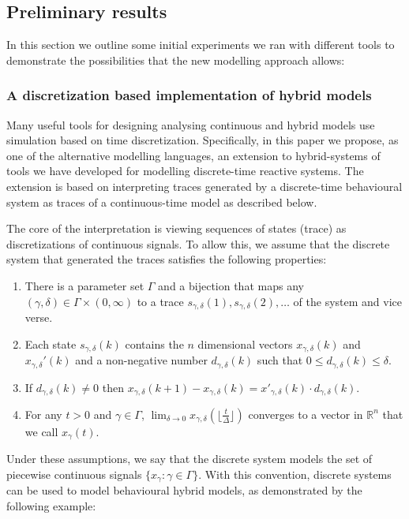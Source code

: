\documentclass[11pt]{article}
\newcounter{example}
\begin{document}
\subsection{Preliminary results}
In this section we outline some initial experiments we ran with different tools to demonstrate the possibilities that the new modelling approach allows:

\subsubsection{A discretization based implementation of hybrid models}
\label{sec:simulation}  
Many useful tools for designing analysing continuous and hybrid models use simulation based on time discretization. Specifically, in this paper we propose, as one of the alternative modelling languages, an extension to hybrid-systems of tools we have developed for modelling discrete-time reactive systems. The  extension is based on interpreting traces generated by a discrete-time behavioural system as traces of a continuous-time model as described below.

The core of the interpretation is viewing sequences of states (trace) as discretizations of continuous signals. To allow this, we assume that the discrete system that generated the traces satisfies the following properties:
\begin{enumerate}
	\item There is a parameter set $\Gamma$ and a bijection that maps any $(\gamma, \delta) \in \Gamma \times (0,\infty)$ to a trace  $s_{\gamma,\delta}(1),s_{\gamma,\delta}(2),\dots$ of the system and vice verse. 
	\item Each state $s_{\gamma,\delta}(k)$ contains the $n$ dimensional vectors $x_{\gamma,\delta}(k)$ and $x_{\gamma,\delta}'(k)$ and a non-negative number $d_{\gamma,\delta}(k)$  such that $0 \leq d_{\gamma,\delta}(k) \leq \delta$.
	\item If $d_{\gamma,\delta}(k) \neq 0$ then  $x_{\gamma,\delta}(k+1) - x_{\gamma,\delta}(k) = x'_{\gamma,\delta}(k) \cdot d_{\gamma,\delta}(k)$.
	\item  For any $t>0$ and $\gamma \in \Gamma$,  $\lim_{\delta \to 0} x_{\gamma,\delta}(\lfloor\frac{t}{\Delta}\rfloor)$ converges to a vector in $\mathbb{R}^n$ that we call $x_\gamma(t)$.
\end{enumerate}

Under these assumptions, we say that the discrete system models the set of piecewise continuous signals $\{ x_\gamma \colon \gamma \in \Gamma \}$.  With this convention, discrete systems can be used to model behavioural hybrid models, as demonstrated by the following example:
\end{document}

